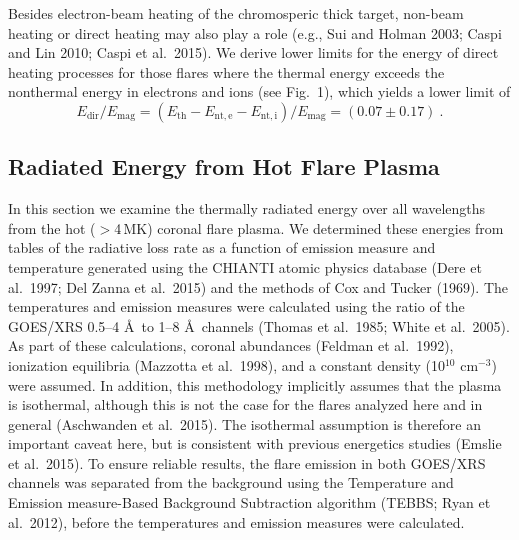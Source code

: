 \documentclass[10pt,preprint]{aastex}  %
\def\ang{\AA}
\begin{document}
Besides electron-beam heating of the chromosperic thick target,
non-beam heating or direct heating may also play a role 
(e.g., Sui and Holman 2003; Caspi and Lin 2010; Caspi et al.~2015). 
We derive lower
limits for the energy of direct heating processes for those flares
where the thermal energy exceeds the nonthermal energy in electrons
and ions (see Fig.~1), which yields a lower limit of 
\begin{equation}
	E_{\mathrm{dir}} / E_{\mathrm{mag}} = 
	(E_{\mathrm{th}} - E_{\mathrm{nt,e}} - E_{\mathrm{nt,i}}) / E_{\mathrm{mag}} = 
	(0.07 \pm 0.17) \ .
\end{equation}

\subsection{	Radiated Energy from Hot Flare Plasma 	}

In this section we examine the thermally radiated energy over all 
wavelengths from the hot ($>$4\,MK) coronal flare plasma.  We determined
these energies from tables of the radiative loss rate as a function of 
emission measure and temperature generated using the CHIANTI atomic 
physics database (Dere et al.~1997; Del Zanna et al.~2015) and the 
methods of Cox and Tucker (1969).  The temperatures and emission 
measures were calculated using the ratio of the GOES/XRS 0.5--4 \ang\
to 1--8 \ang\ channels (Thomas et al.~1985; White et al.~2005). 
As part of these calculations, coronal abundances (Feldman et al.~1992), 
ionization equilibria (Mazzotta et al.~1998), and a constant density 
(10$^{10}$ cm$^{-3}$) were assumed.  In addition, this methodology 
implicitly assumes that the plasma is isothermal, although this is 
not the case for the flares analyzed here and in general 
(Aschwanden et al.~2015). The isothermal 
assumption is therefore an important caveat here, but is consistent 
with previous energetics studies (Emslie et al.~2015). To ensure 
reliable results, the flare emission in both GOES/XRS channels was 
separated from the background using the Temperature and Emission 
measure-Based Background Subtraction algorithm (TEBBS; Ryan et al.~2012),
before the temperatures and emission measures were calculated.
\end{document}
